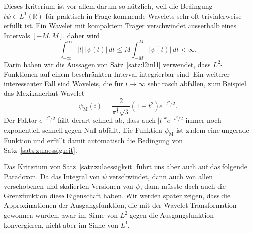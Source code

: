 
Dieses Kriterium ist vor allem darum so nützlich, weil die Bedingung
$t\psi\in L^1(\mathbb R)$ für praktisch in Frage kommende Wavelets sehr
oft trivialerweise erfüllt ist.
Ein Wavelet mit kompaktem Träger verschwindet ausserhalb eines Intervals
$[-M,M]$, daher wird 
\[
\int_{-\infty}^\infty |t|\,|\psi(t)|\,dt
\le 
M \int_{-M}^M |\psi(t)|\,dt < \infty.
\]
Darin haben wir die Aussagen von Satz~\ref{satz:l2inl1} verwendet,
dass $L^2$-Funktionen auf einem beschränkten Interval integrierbar sind.
Ein weiterer interessanter Fall sind Wavelets, die für $t\to\infty$
sehr rasch abfallen, zum Beispiel das Mexikanerhut-Wavelet
\begin{equation}
\psi_{\text{M}}(t) = \frac{2}{\pi^{\frac14}\sqrt{3}}(1-t^2) e^{-t^2/2}.
\label{wavelet:mexikanerhut}
\end{equation}
Der Faktor $e^{-t^2/2}$ fällt derart schnell ab, dass auch $|t|^k e^{-t^2/2}$
immer noch exponentiell schnell gegen Null abfällt.
Die Funktion $\psi_{\text{M}}$ ist zudem eine ungerade Funktion und
erfüllt damit automatisch die Bedingung von Satz~\ref{satz:zulaessigkeit}.


Das Kriterium von Satz~\ref{satz:zulaessigkeit} führt uns aber auch auf
das folgende Paradoxon. 
Da das Integral von $\psi$ verschwindet, dann auch von allen verschobenen
und skalierten Versionen von $\psi$, dann müsste doch auch die Grenzfunktion
diese Eigenschaft haben.
Wir werden später zeigen, dass die Approximationen der Ausgangsfunktion,
die mit der Wavelet-Transformation gewonnen wurden, zwar im Sinne von $L^2$
gegen die Ausgangsfunktion konvergieren, nicht aber im Sinne von $L^1$.



